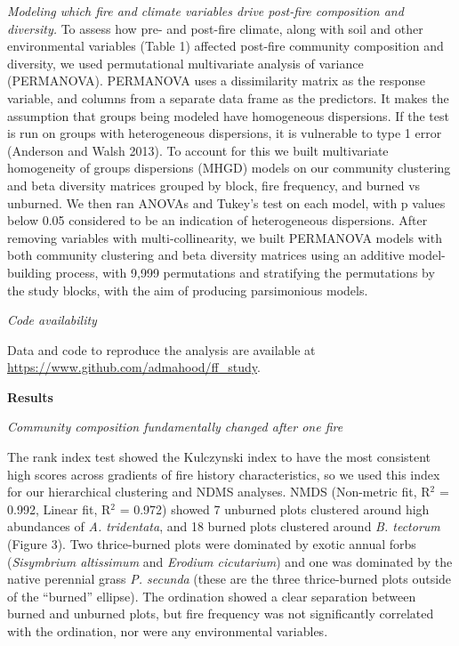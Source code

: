 \documentclass[12pt,]{article}
\begin{document}
\emph{Modeling which fire and climate variables drive post-fire
composition and diversity.} To assess how pre- and post-fire climate,
along with soil and other environmental variables (Table 1) affected
post-fire community composition and diversity, we used permutational
multivariate analysis of variance (PERMANOVA). PERMANOVA uses a
dissimilarity matrix as the response variable, and columns from a
separate data frame as the predictors. It makes the assumption that
groups being modeled have homogeneous dispersions. If the test is run on
groups with heterogeneous dispersions, it is vulnerable to type 1 error
(Anderson and Walsh 2013). To account for this we built multivariate
homogeneity of groups dispersions (MHGD) models on our community
clustering and beta diversity matrices grouped by block, fire frequency,
and burned vs unburned. We then ran ANOVAs and Tukey's test on each
model, with p values below 0.05 considered to be an indication of
heterogeneous dispersions. After removing variables with
multi-collinearity, we built PERMANOVA models with both community
clustering and beta diversity matrices using an additive model-building
process, with 9,999 permutations and stratifying the permutations by the
study blocks, with the aim of producing parsimonious models.

\emph{Code availability}

Data and code to reproduce the analysis are available at
\url{https://www.github.com/admahood/ff_study}.

\textbf{Results}

\emph{Community composition fundamentally changed after one fire}

The rank index test showed the Kulczynski index to have the most
consistent high scores across gradients of fire history characteristics,
so we used this index for our hierarchical clustering and NDMS analyses.
NMDS (Non-metric fit, R\(^2\) = 0.992, Linear fit, R\(^2\) = 0.972)
showed 7 unburned plots clustered around high abundances of \emph{A.
tridentata}, and 18 burned plots clustered around \emph{B. tectorum}
(Figure 3). Two thrice-burned plots were dominated by exotic annual
forbs (\emph{Sisymbrium altissimum} and \emph{Erodium cicutarium}) and
one was dominated by the native perennial grass \emph{P. secunda} (these
are the three thrice-burned plots outside of the ``burned'' ellipse).
The ordination showed a clear separation between burned and unburned
plots, but fire frequency was not significantly correlated with the
ordination, nor were any environmental variables.
\end{document}
